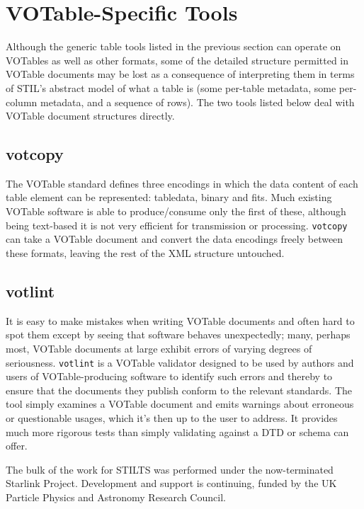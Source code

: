 \documentclass[11pt,twoside]{article}  %
\begin{document}
\section{VOTable-Specific Tools}

Although the generic table tools listed in the previous section
can operate on VOTables as well as other formats, 
some of the detailed structure permitted in VOTable documents 
may be lost as a consequence of interpreting them in terms of
STIL's abstract model of what a table is (some per-table metadata,
some per-column metadata, and a sequence of rows).
The two tools listed below deal with VOTable document structures
directly.

\subsection{votcopy}

The VOTable standard defines three encodings in which the
data content of each table element can be represented:
{\sc tabledata}, {\sc binary} and {\sc fits}.
Much existing VOTable software is able to produce/consume only the
first of these, although being text-based it is not very efficient 
for transmission or processing.
{\tt votcopy} can take a VOTable document and convert the data
encodings freely between these formats, leaving the rest of
the XML structure untouched.

\subsection{votlint}

It is easy to make mistakes when writing VOTable documents
and often hard to spot them except by seeing that software 
behaves unexpectedly;
many, perhaps most, VOTable documents at large
exhibit errors of varying degrees of seriousness.
{\tt votlint} is a VOTable validator designed to be used
by authors and users of VOTable-producing software to 
identify such errors and thereby to ensure that the documents they
publish conform to the relevant standards.
The tool simply examines a VOTable document and emits 
warnings about erroneous or questionable usages,
which it's then up to the user to address.
It provides much more rigorous tests than simply validating
against a DTD or schema can offer.

\acknowledgements

The bulk of the work for STILTS was performed under the now-terminated
Starlink Project.  Development and support is continuing,
funded by the UK Particle Physics and Astronomy Research Council.
\end{document}
